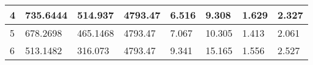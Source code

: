 \begin{table}[]
{\begin{tabular}{|l|l|l|l|l|l|l|l|}
4                                                               & 735.6444                                                                                                  & 514.937                                                                                                    & 4793.47                                                                                                                  & 6.516                                                                                   & 9.308                                                                                    & 1.629                                                                           & 2.327                                                                            \\ \hline
5                                                               & 678.2698                                                                                                  & 465.1468                                                                                                   & 4793.47                                                                                                                  & 7.067                                                                                   & 10.305                                                                                   & 1.413                                                                           & 2.061                                                                            \\ \hline
6                                                               & 513.1482                                                                                                  & 316.073                                                                                                    & 4793.47                                                                                                                  & 9.341                                                                                   & 15.165                                                                                   & 1.556                                                                           & 2.527                                                                            \\ \hline
\end{tabular}}
\end{table}

